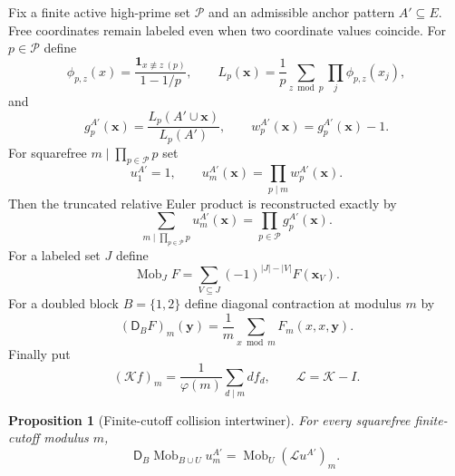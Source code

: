 \documentclass[11pt]{article}
\newtheorem{proposition}[theorem]{Proposition}
\theoremstyle{definition}
\theoremstyle{remark}
\newcommand{\1}{\mathbf 1}
\newcommand{\ph}{\varphi}
\newcommand{\Kcal}{\mathcal K}
\newcommand{\Lcal}{\mathcal L}
\begin{document}
Fix a finite active high-prime set $\mathcal P$ and an admissible anchor pattern
$A'\subseteq E$.  Free coordinates remain labeled even when two coordinate
values coincide.  For $p\in\mathcal P$ define
\begin{equation}\label{eq:collision-local}
\phi_{p,z}(x)=\frac{\1_{x\not\equiv z\ (p)}}{1-1/p},
\qquad
L_p(\mathbf x)=\frac1p\sum_{z\bmod p}\prod_j\phi_{p,z}(x_j),
\end{equation}
and
\begin{equation}\label{eq:collision-gw}
g_p^{A'}(\mathbf x)=\frac{L_p(A'\cup\mathbf x)}{L_p(A')},
\qquad
w_p^{A'}(\mathbf x)=g_p^{A'}(\mathbf x)-1.
\end{equation}
For squarefree $m\mid\prod_{p\in\mathcal P}p$ set
\begin{equation}\label{eq:collision-u}
u_1^{A'}=1,
\qquad
u_m^{A'}(\mathbf x)=\prod_{p\mid m}w_p^{A'}(\mathbf x).
\end{equation}
Then the truncated relative Euler product is reconstructed exactly by
\begin{equation}\label{eq:collision-euler-reconstruction}
\sum_{m\mid\prod_{p\in\mathcal P}p}u_m^{A'}(\mathbf x)
=\prod_{p\in\mathcal P}g_p^{A'}(\mathbf x).
\end{equation}
For a labeled set $J$ define
\begin{equation}\label{eq:collision-mob}
\operatorname{Mob}_JF
=\sum_{V\subseteq J}(-1)^{|J|-|V|}F(\mathbf x_V).
\end{equation}
For a doubled block $B=\{1,2\}$ define diagonal contraction at modulus $m$ by
\begin{equation}\label{eq:collision-D}
(\mathsf D_BF)_m(\mathbf y)
=\frac1m\sum_{x\bmod m}F_m(x,x,\mathbf y).
\end{equation}
Finally put
\begin{equation}\label{eq:L-operator}
(\Kcal f)_m=\frac1{\ph(m)}\sum_{d\mid m}d f_d,
\qquad
\Lcal=\Kcal-I.
\end{equation}

\begin{proposition}[Finite-cutoff collision intertwiner]\label{prop:collision-intertwiner}
For every squarefree finite-cutoff modulus $m$,
\begin{equation}\label{eq:collision-intertwiner}
\boxed{
\mathsf D_B\operatorname{Mob}_{B\cup U}u_m^{A'}
=\operatorname{Mob}_U(\Lcal u^{A'})_m.
}
\end{equation}
\end{proposition}
\end{document}
